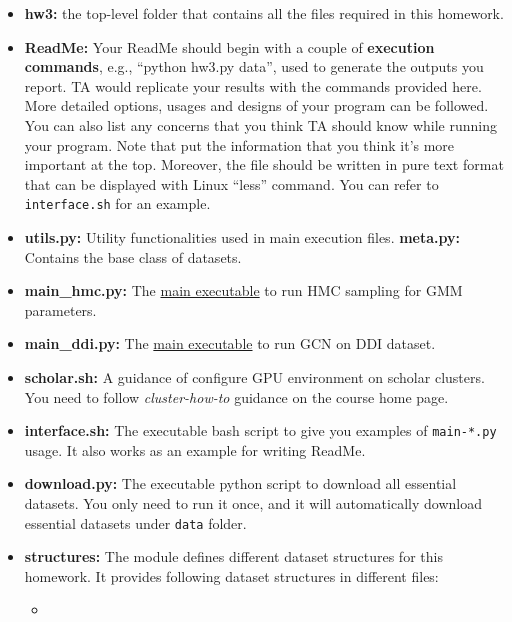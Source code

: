 \documentclass{article}
\newcommand{\homeworknumber}{3\xspace}
\begin{document}
%
\begin{itemize}
%
\item
    \textbf{hw\homeworknumber:}
    the top-level folder that contains all the files required in this homework.
%
\item
    \textbf{ReadMe:}
    Your ReadMe should begin with a couple of \textbf{execution commands},
    e.g., ``python hw\homeworknumber.py data'', used to generate the outputs
    you report.
    TA would replicate your results with the commands provided here.
    More detailed options, usages and designs of your program can be followed.
    You can also list any concerns that you think TA should know while running
    your program.
    Note that put the information that you think it's more important at the
    top.
    Moreover, the file should be written in pure text format that can be
    displayed with Linux ``less'' command.
    You can refer to \texttt{interface.sh} for an example.
%
\item
    \textbf{utils.py:}
    Utility functionalities used in main execution files.
    \textbf{meta.py:}
    Contains the base class of datasets.
\item
    \textbf{main\_hmc.py:}
    The \underline{main executable} to run HMC sampling for GMM parameters.
\item
    \textbf{main\_ddi.py:}
    The \underline{main executable} to run GCN on DDI dataset.
\item
    \textbf{scholar.sh:}
    A guidance of configure GPU environment on scholar clusters.
    You need to follow \emph{cluster-how-to} guidance on the course home page.
%
\item
    \textbf{interface.sh:}
    The executable bash script to give you examples of \texttt{main-*.py}
    usage.
    It also works as an example for writing ReadMe.
%
\item
    \textbf{download.py:}
    The executable python script to download all essential datasets.
    You only need to run it once, and it will automatically download essential
    datasets under \texttt{data} folder.
%
\item
    \textbf{structures:}
    The module defines different dataset structures for this homework.
    It provides following dataset structures in different files:
    \begin{itemize}
    \item

\end{itemize}
\end{itemize}
\end{document}
